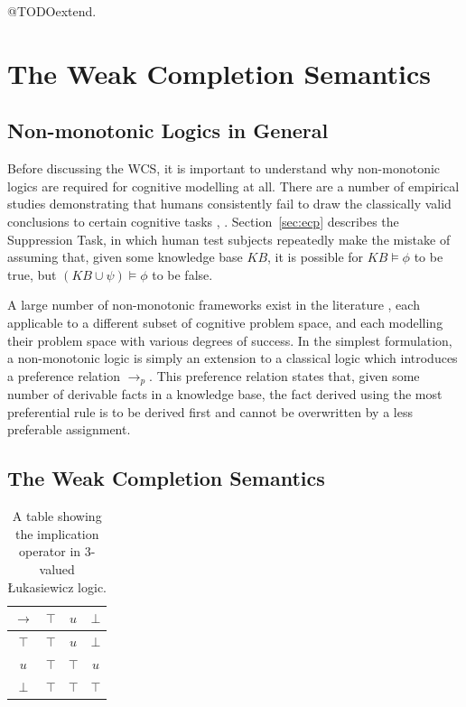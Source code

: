 \documentclass{article}
\begin{document}
@TODOextend. 

\section{The Weak Completion Semantics} \label{sec:wcs}
\subsection{Non-monotonic Logics in General}

Before discussing the WCS, it is important to understand why non-monotonic logics are required for cognitive modelling at all. There are a number of empirical studies demonstrating that humans consistently fail to draw the classically valid conclusions to certain cognitive tasks \citep{byrne1989suppressing}, \citep{wason1968reasoning}. Section~\ref{sec:ecp} describes the Suppression Task, in which human test subjects repeatedly make the mistake of assuming that, given some knowledge base $KB$, it is possible for $KB \models \phi$ to be true, but $(KB \cup \psi) \models \phi$ to be false.

A large number of non-monotonic frameworks exist in the literature \citep{mcdermott1980non}, each applicable to a different subset of cognitive problem space, and each modelling their problem space with various degrees of success. In the simplest formulation, a non-monotonic logic is simply an extension to a classical logic which introduces a preference relation $\rightarrow_p$. This preference relation states that, given some number of derivable facts in a knowledge base, the fact derived using the most preferential rule is to be derived first and cannot be overwritten by a less preferable assignment.

\subsection{The Weak Completion Semantics}

\begin{table}
\begin{center}


\begin{tabular}{ c | c c c }
  $\rightarrow$& $\top$ & $u$ & $\bot$ \\ \hline
 $\top$ & $\top$ & $u$ & $\bot$ \\  
 $u$ & $\top$ & $\top$ & $u$\\  
 $\bot$ & $\top$ & $\top$ & $\top$
\end{tabular}
\caption{A table showing the implication operator in 3-valued \L ukasiewicz logic.}
\label{tbl:luk}

\end{center}
\end{table}
\end{document}
